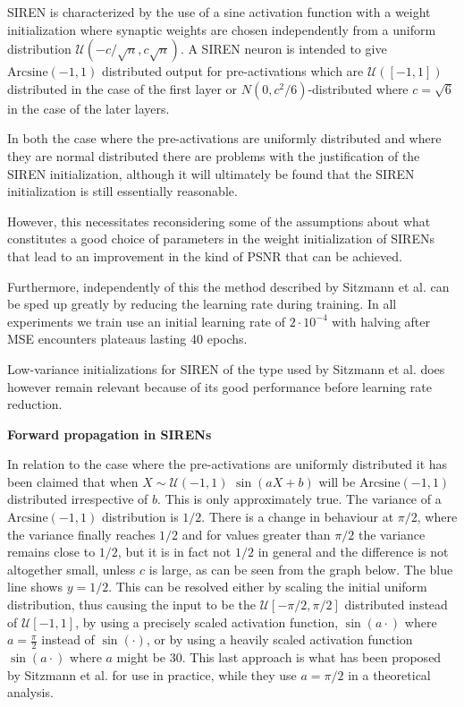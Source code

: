 \documentclass{letter}
\begin{document}

SIREN is characterized by the use of a sine activation function with a weight initialization where synaptic weights are chosen independently from a uniform distribution $\mathcal{U}(-c/\sqrt{n},c\sqrt{n})$. A SIREN neuron is intended to give $\text{Arcsine}(-1,1)$ distributed output for pre-activations which are $\mathcal{U}([-1,1])$ distributed in the case of the first layer or $N(0, c^2/6)$-distributed where $c=\sqrt{6}$ in the case of the later layers.

In both the case where the pre-activations are uniformly distributed and where they are normal distributed there are problems with the justification of the SIREN initialization, although it will ultimately be found that the SIREN initialization is still essentially reasonable.

However, this necessitates reconsidering some of the assumptions about what constitutes a good choice of parameters in the weight initialization of SIRENs that lead to an improvement in the kind of PSNR that can be achieved.

Furthermore, independently of this the method described by Sitzmann et al. can be sped up greatly by reducing the learning rate during training. In all experiments we train use an initial learning rate of $2\cdot 10^{-4}$ with halving after MSE encounters plateaus lasting 40 epochs.

Low-variance initializations for SIREN of the type used by Sitzmann et al. does however remain relevant because of its good performance before learning rate reduction.

{\bf Forward propagation in SIRENs}

In relation to the case where the pre-activations are uniformly distributed it has been claimed that when $X\sim \mathcal{U}(-1,1)$ $\sin(aX+b)$ will be $\text{Arcsine}(-1,1)$ distributed irrespective of $b$. This is only approximately true. The variance of a $\text{Arcsine}(-1,1)$ distribution is $1/2$. There is a change in behaviour at $\pi/2$, where the variance finally reaches $1/2$ and for values greater than $\pi/2$ the variance remains close to $1/2$, but it is in fact not $1/2$  in general and the difference is not altogether small, unless $c$ is large, as can be seen from the graph below. The blue line shows $y=1/2$. This can be resolved either by scaling the initial uniform distribution, thus causing the input to be the $\mathcal{U}[-\pi/2,\pi/2]$ distributed instead of $\mathcal{U}[-1,1]$, by using a precisely scaled activation function, $\sin(a\cdot)$ where $a=\frac{\pi}{2}$ instead of $\sin(\cdot)$, or by using a heavily scaled activation function $\sin(a\cdot)$ where $a$ might be $30$. This last approach is what has been proposed by Sitzmann et al. for use in practice, while they use $a=\pi/2$ in a theoretical analysis.
\end{document}
